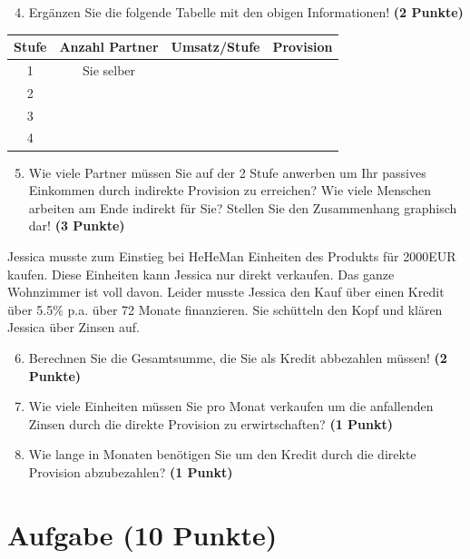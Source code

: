 \documentclass[a4paper, 9pt]{scrartcl}\usepackage[]{graphicx}\usepackage[]{xcolor}
\begin{document}
\begin{enumerate}
  \setcounter{enumi}{3}
\item Ergänzen Sie die folgende Tabelle mit den obigen Informationen! \textbf{(2 Punkte)}
\end{enumerate}

\begin{center}
\begin{tabular}{c|c|c|c}
  \toprule
  \textbf{Stufe} & \textbf{Anzahl Partner}  & \textbf{Umsatz/Stufe} & \textbf{Provision}\\
  \midrule
  1 & Sie selber  &  & \\ \midrule
  2 &   &  &  \\ \midrule
  3 &   &  &  \\ \midrule
  4 &   &  &  \\
  \bottomrule
\end{tabular}
\end{center}

\begin{enumerate}
  \setcounter{enumi}{4}
\item Wie viele Partner müssen Sie auf der 2 Stufe anwerben um Ihr passives Einkommen durch indirekte Provision zu erreichen? Wie viele Menschen arbeiten am Ende indirekt für Sie? Stellen Sie den Zusammenhang graphisch dar!  \textbf{(3 Punkte)}
\end{enumerate}

Jessica musste zum Einstieg bei HeHeMan Einheiten des Produkts für 2000EUR kaufen. Diese Einheiten kann Jessica nur direkt verkaufen. Das ganze Wohnzimmer ist voll davon. Leider musste Jessica den Kauf über einen Kredit über 5.5\% p.a. über 72 Monate finanzieren. Sie schütteln den Kopf und klären Jessica über Zinsen auf.

\begin{enumerate}
  \setcounter{enumi}{5}
\item Berechnen Sie die Gesamtsumme, die Sie als Kredit abbezahlen müssen! \textbf{(2 Punkte)}
\item Wie viele Einheiten müssen Sie pro Monat verkaufen um die anfallenden Zinsen durch die direkte Provision zu erwirtschaften? \textbf{(1 Punkt)}
\item Wie lange in Monaten benötigen Sie um den Kredit durch die direkte Provision abzubezahlen? \textbf{(1 Punkt)}
\end{enumerate} 
\clearpage

\section{Aufgabe \hfill (10 Punkte)}
\end{document}
